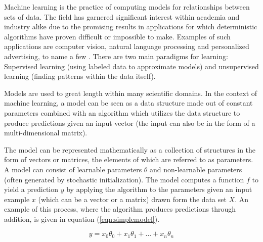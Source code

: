 Machine learning is the practice of computing models for relationships between sets of data. The field has garnered significant interest within academia and industry alike due to the promising results in applications for which deterministic algorithms have proven difficult or impossible to make. Examples of such applications are computer vision, natural language processing and personalized advertising, to name a few \cite{sebe2005machine, allen2003natural, malheiros2012too}. There are two main paradigms for learning: Supervised learning (using labeled data to approximate models) and unsupervised learning (finding patterns within the data itself). 

Models are used to great length within many scientific domains. In the context of machine learning, a model can be seen as a data structure made out of constant parameters combined with an algorithm which utilizes the data structure to produce predictions given an input vector (the input can also be in the form of a multi-dimensional matrix). 

The model can be represented mathematically as a collection of structures in the form of vectors or matrices, the elements of which are referred to as parameters. A model can consist of learnable parameters $\theta$ and non-learnable parameters (often generated by stochastic initialization). The model computes a function $f$ to yield a prediction $y$ by applying the algorithm to the parameters given an input example $x$ (which can be a vector or a matrix) drawn form the data set $X$. An example of this process, where the algorithm produces predictions through addition, is given in equation (\ref{eqn:simplemodel}).

\begin{equation}
\label{eqn:simplemodel}
 y = x_0\theta_0 + x_1\theta_1 + ... + x_n\theta_n
\end{equation}

